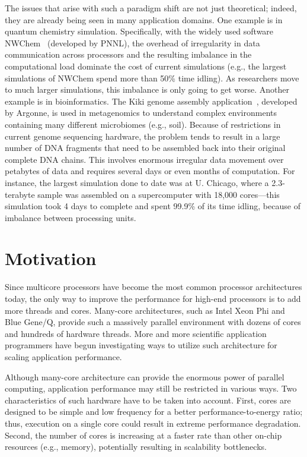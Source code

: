 The issues that arise with such a paradigm shift are not just
theoretical; indeed, they are already being seen in many application
domains.  One example is in quantum chemistry simulation.
Specifically, with the widely used software NWChem~\cite{nwchem}
(developed by PNNL), the overhead of irregularity in data
communication across processors and the resulting imbalance in the
computational load dominate the cost of current simulations (e.g., the
largest simulations of NWChem spend more than 50\% time idling).  As
researchers move to much larger simulations, this imbalance is only
going to get worse.  Another example is in bioinformatics.  The Kiki
genome assembly application~\cite{kiki}, developed by Argonne, is used
in metagenomics to understand complex environments containing many
different microbiomes (e.g., soil).  Because of restrictions in
current genome sequencing hardware, the problem tends to result in a
large number of DNA fragments that need to be assembled back into
their original complete DNA chains.  This involves enormous irregular
data movement over petabytes of data and requires several days or even
months of computation.  For instance, the largest simulation done to
date was at U. Chicago, where a 2.3-terabyte sample was assembled on a
supercomputer with 18,000 cores---this simulation took 4 days to
complete and spent 99.9\% of its time idling, because of imbalance
between processing units.

\section{Motivation}

Since multicore processors have become the most common processor
architectures today, the only way to improve the performance for
high-end processors is to add more threads and cores. Many-core
architectures, such as Intel Xeon Phi and Blue Gene/Q, provide such a
massively parallel environment with dozens of cores and hundreds of
hardware threads. More and more scientific application programmers
have begun investigating ways to utilize such architecture for scaling
application performance.

Although many-core architecture can provide the enormous power of
parallel computing, application performance may still be restricted in
various ways. Two characteristics of such hardware have to be taken
into account. First, cores are designed to be simple and low frequency
for a better performance-to-energy ratio; thus, execution on a single
core could result in extreme performance degradation. Second, the
number of cores is increasing at a faster rate than other on-chip
resources (e.g., memory), potentially resulting in scalability
bottlenecks.

